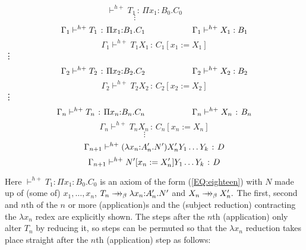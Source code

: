 \documentclass{LMCS}
\def\:{\mathbin{\,:\,}}
\begin{document}
{\small
$$\vdash^{h+} T_1\:\Pi x_1{:}B_0.C_0\hspace{1cm}$$\vspace{-3mm}
$$\vdots\hspace {2cm}$$
$$\Gamma_1\vdash^{h+} T_1\:\Pi x_1{:}B_1.C_1\hspace {2cm}\Gamma_1\vdash^{h+} X_1:B_1 \vspace{-2mm}$$
\vspace{-2mm}\hspace{3cm}\hbox{\vrule height .4pt width 10cm}
$$\Gamma_1\vdash^{h+} T_1X_1\:C_1[x_1:=X_1]$$
\hspace {6.2cm}\vdots
$$\Gamma_2\vdash^{h+} T_2\:\Pi x_2{:}B_2.C_2\hspace {2cm}\Gamma_2\vdash^{h+} X_2:B_2\vspace{-2mm}$$
\vspace{-2mm}\hspace{3cm}\hbox{\vrule height .4pt width 10cm}
$$\Gamma_2\vdash^{h+} T_2X_2\:C_2[x_2:=X_2]$$
\hspace {6.2cm}\vdots
$$\Gamma_n\vdash^{h+} T_n\:\Pi x_n{:}B_n.C_n\hspace {2cm}\Gamma_n\vdash^{h+} X_n\:B_n\vspace{-2mm}$$
\vspace{-2mm}\hspace{3cm}\hbox{\vrule height .4pt width 10cm}
$$\Gamma_n\vdash^{h+} T_nX_n\:C_n[x_n:=X_n] $$
\vspace{-2mm}\hspace{3cm}
$$\vdots\hspace {1cm}$$
$$\Gamma_{n+1}\vdash^{h+} (\lambda x_n{:}A_n'.N')X_n'Y_1\dots Y_k\:D\vspace{-2mm}$$
\vspace{-2mm}\hspace{3cm}\hbox{\vrule height .4pt width 10cm}
$$\Gamma_{n+1}\vdash^{h+} N'[x_n:=X_n']Y_1\dots Y_k\:D\vspace{-2mm}$$
}

 \noindent Here $\vdash^{h+} T_1 :\Pi x_1{:}B_0.C_0$ is an axiom of
  the form (\ref{EQ:eighteen}) with $N$ made up of (some of)
  $x_1,\dots ,x_n$, $ T_n\to\hskip -7pt\to_{\beta}\lambda
  x_n{:}A_n'.N'$ and $X_n\to\hskip -7pt\to_{\beta} X_n'.$ The
  first, second and $n$th of the $n$ or more (application)s and the
  (subject reduction) contracting the $\lambda x_n$ redex are
  explicitly shown. The steps after the $n$th (application) only alter
  $T_n$ by reducing it, so steps can be permuted so that the $\lambda
  x_n$ reduction takes place straight after the $n$th (application)
  step as follows:
\medskip
\end{document}
